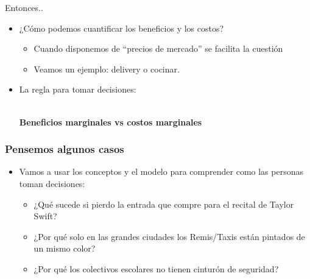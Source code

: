 \documentclass{beamer}
\begin{document}
\begin{frame}{Entonces.. }
    \begin{itemize}
        \item ¿Cómo podemos cuantificar los beneficios y los costos? 
        \begin{itemize}
        \item Cuando disponemos de ``precios de mercado'' se facilita la cuestión
        \item Veamos un ejemplo: delivery o cocinar.
        \end{itemize}
        \item La regla para tomar decisiones:
        \begin{boxB}
             \\ \vspace{2mm}
            \textbf{Beneficios marginales vs costos marginales} \centering 
        \end{boxB}
    \end{itemize} 
\end{frame}

\begin{frame}
\frametitle{Pensemos algunos casos}
\begin{itemize}
    \item Vamos a usar los conceptos y el modelo para comprender como las personas toman decisiones: \vspace{2mm}
    \begin{itemize} 
    \item ¿Qué sucede si pierdo la entrada que compre para el recital de Taylor Swift? \vspace{2mm}
    \item ¿Por qué solo en las grandes ciudades los Remis/Taxis están pintados de un mismo color? \vspace{2mm}
    \item ¿Por qué los colectivos escolares no tienen cinturón de seguridad? \vspace{2mm}
    \end{itemize}
\end{itemize} 
\end{frame}
\end{document}
